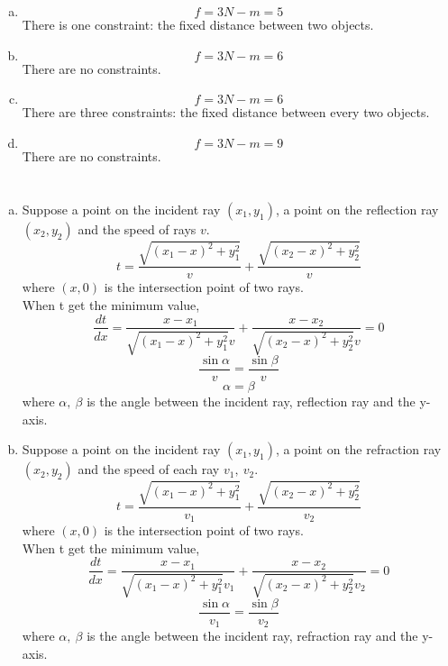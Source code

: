 \documentclass{article}
\begin{document}
\section{}
\begin{enumerate}[(a)]
	\item
	$$f=3N-m=5$$
	There is one constraint: the fixed distance between two objects.
	\item
	$$f=3N-m=6$$
	There are no constraints.
	\item
	$$f=3N-m=6$$
	There are three constraints: the fixed distance between every two objects.
	\item
	$$f=3N-m=9$$
	There are no constraints.
\end{enumerate}

\section{}
\begin{enumerate}[(a)]
	\item
	Suppose a point on the incident ray $(x_1,y_1)$, a point on the reflection ray $(x_2,y_2)$ and the speed of rays $v$.
	$$t=\frac{\sqrt{(x_1-x)^2+y_1^2}}{v}+\frac{\sqrt{(x_2-x)^2+y_2^2}}{v}$$
	where $(x,0)$ is the intersection point of two rays.\\
	When t get the minimum value,	
	$$\frac{dt}{dx}=\frac{x-x_1}{\sqrt{(x_1-x)^2+y_1^2}v}+\frac{x-x_2}{\sqrt{(x_2-x)^2+y_2^2}v}=0$$
	$$\frac{\sin\alpha}{v}=\frac{\sin\beta}{v}$$
	$$\alpha=\beta$$
	where $\alpha,\ \beta$ is the angle between the incident ray, reflection ray and the y-axis.
	\item
	Suppose a point on the incident ray $(x_1,y_1)$, a point on the refraction ray $(x_2,y_2)$ and the speed of each ray $v_1,\ v_2$.
	$$t=\frac{\sqrt{(x_1-x)^2+y_1^2}}{v_1}+\frac{\sqrt{(x_2-x)^2+y_2^2}}{v_2}$$
	where $(x,0)$ is the intersection point of two rays.\\
	When t get the minimum value,	
	$$\frac{dt}{dx}=\frac{x-x_1}{\sqrt{(x_1-x)^2+y_1^2}v_1}+\frac{x-x_2}{\sqrt{(x_2-x)^2+y_2^2}v_2}=0$$
	$$\frac{\sin\alpha}{v_1}=\frac{\sin\beta}{v_2}$$
	where $\alpha,\ \beta$ is the angle between the incident ray, refraction ray and the y-axis.
\end{enumerate}
\end{document}
